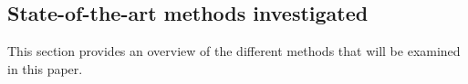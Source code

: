 \subsection{State-of-the-art methods investigated}\label{subsec:sotaoverview}
This section provides an overview of the different methods that will be examined in this paper.






